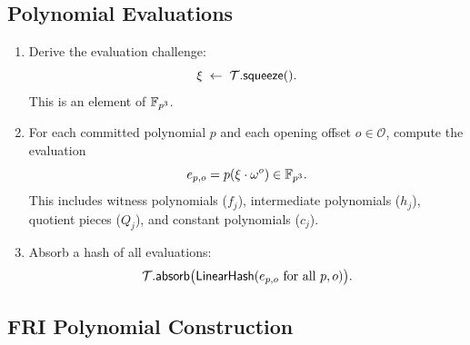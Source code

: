 \subsection{Polynomial Evaluations}
\label{sec:evals}

\begin{enumerate}[label=(\roman*)]
  \item Derive the evaluation challenge:
        \[
          \xi \;\leftarrow\; \mathcal{T}.\textsf{squeeze}().
        \]
        This is an element of $\mathbb{F}_{p^3}$.

  \item For each committed polynomial $p$ and each opening offset $o \in \mathcal{O}$,
        compute the evaluation
        \begin{equation}
          \label{eq:eval}
          e_{p,o} = p(\xi \cdot \omega^o) \in \mathbb{F}_{p^3}.
        \end{equation}
        This includes witness polynomials ($f_j$),
        intermediate polynomials ($h_j$),
        quotient pieces ($Q_j$),
        and constant polynomials ($c_j$).

  \item Absorb a hash of all evaluations:
        \[
          \mathcal{T}.\textsf{absorb}\bigl(\textsf{LinearHash}(e_{p,o} \text{ for all } p, o)\bigr).
        \]
\end{enumerate}

\subsection{FRI Polynomial Construction}
\label{sec:fri-poly}

